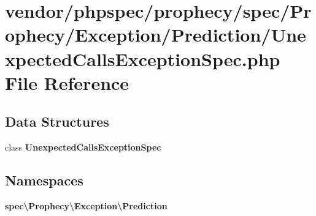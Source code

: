 \section{vendor/phpspec/prophecy/spec/\+Prophecy/\+Exception/\+Prediction/\+Unexpected\+Calls\+Exception\+Spec.php File Reference}
\label{_unexpected_calls_exception_spec_8php}
\subsection*{Data Structures}
\begin{DoxyCompactItemize}
\item 
class {\bf Unexpected\+Calls\+Exception\+Spec}
\end{DoxyCompactItemize}
\subsection*{Namespaces}
\begin{DoxyCompactItemize}
\item 
 {\bf spec\textbackslash{}\+Prophecy\textbackslash{}\+Exception\textbackslash{}\+Prediction}
\end{DoxyCompactItemize}
